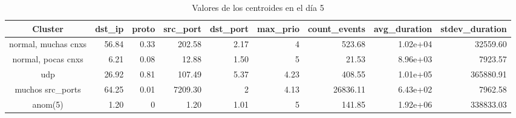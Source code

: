 \begin{table}[h!]
    \begingroup
    \setlength{\tabcolsep}{2pt} %
    \hspace*{-3cm}
    \begin{tabular}{|c|r|r|r|r|r|r|r|r|}
    \hline
    \textbf{Cluster}    & \textbf{dst\_ip} & \textbf{proto} & \textbf{src\_port} & \textbf{dst\_port} & \textbf{max\_prio} & \textbf{count\_events} & \textbf{avg\_duration} & \textbf{stdev\_duration} \\ \hline
    normal, muchas cnxs & 56.84            & 0.33           & 202.58             & 2.17               & 4                  & 523.68                 & 1.02e+04               & 32559.60                 \\ \hline
    normal, pocas cnxs  & 6.21             & 0.08           & 12.88              & 1.50               & 5                  & 21.53                  & 8.96e+03               & 7923.57                  \\ \hline
    udp                 & 26.92            & 0.81           & 107.49             & 5.37               & 4.23               & 408.55                 & 1.01e+05               & 365880.91                \\ \hline
    muchos src\_ports   & 64.25            & 0.01           & 7209.30            & 2                  & 4.13               & 26836.11               & 6.43e+02               & 7962.58                  \\ \hline
    anom(5)             & 1.20             & 0              & 1.20               & 1.01               & 5                  & 141.85                 & 1.92e+06               & 338833.03                \\ \hline
    \end{tabular}
    \endgroup
\caption{Valores de los centroides en el día 5}
\label{tab:dia5}
\end{table}


